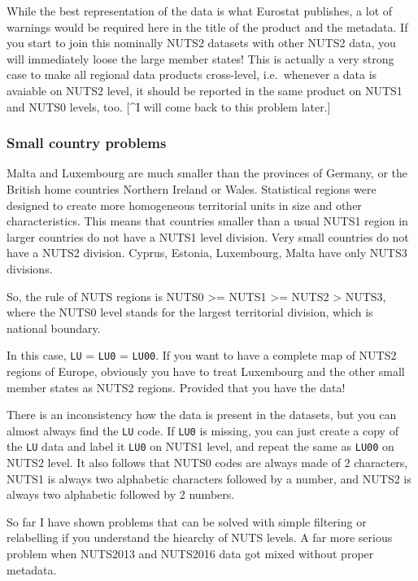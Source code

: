 \documentclass[]{article}
\begin{document}
While the best representation of the data is what Eurostat publishes, a
lot of warnings would be required here in the title of the product and
the metadata. If you start to join this nominally NUTS2 datasets with
other NUTS2 data, you will immediately loose the large member states!
This is actually a very strong case to make all regional data products
cross-level, i.e.~whenever a data is avaiable on NUTS2 level, it should
be reported in the same product on NUTS1 and NUTS0 levels, too. {[}\^{}I
will come back to this problem later.{]}

\hypertarget{small-country-problems}{%
\subsubsection{Small country problems}\label{small-country-problems}}

Malta and Luxembourg are much smaller than the provinces of Germany, or
the British home countries Northern Ireland or Wales. Statistical
regions were designed to create more homogeneous territorial units in
size and other characteristics. This means that countries smaller than a
usual NUTS1 region in larger countries do not have a NUTS1 level
division. Very small countries do not have a NUTS2 division. Cyprus,
Estonia, Luxembourg, Malta have only NUTS3 divisions.

So, the rule of NUTS regions is NUTS0 \textgreater{}= NUTS1
\textgreater{}= NUTS2 \textgreater{} NUTS3, where the NUTS0 level stands
for the largest territorial division, which is national boundary.

In this case, \texttt{LU} = \texttt{LU0} = \texttt{LU00}. If you want to
have a complete map of NUTS2 regions of Europe, obviously you have to
treat Luxembourg and the other small member states as NUTS2 regions.
Provided that you have the data!

There is an inconsistency how the data is present in the datasets, but
you can almost always find the \texttt{LU} code. If \texttt{LU0} is
missing, you can just create a copy of the \texttt{LU} data and label it
\texttt{LU0} on NUTS1 level, and repeat the same as \texttt{LU00} on
NUTS2 level. It also follows that NUTS0 codes are always made of 2
characters, NUTS1 is always two alphabetic characters followed by a
number, and NUTS2 is always two alphabetic followed by 2 numbers.

So far I have shown problems that can be solved with simple filtering or
relabelling if you understand the hiearchy of NUTS levels. A far more
serious problem when NUTS2013 and NUTS2016 data got mixed without proper
metadata.
\end{document}
